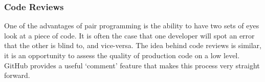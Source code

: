 \documentclass[12pt]{article}
\begin{document}
\subsubsection{Code Reviews}

One of the advantages of pair programming is the ability to have two sets of eyes look at a piece of code. It is often the case that one developer will spot an error that the other is blind to, and vice-versa. The idea behind code reviews is similar, it is an opportunity to assess the quality of production code on a low level. GitHub provides a useful `comment' feature that makes this process very straight forward. 
\end{document}
